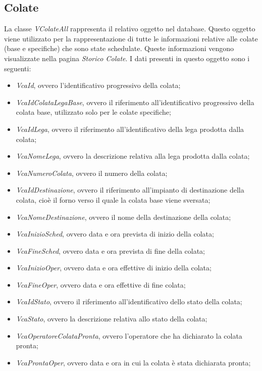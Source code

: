   \subsection{Colate}
  La classe \textit{VColateAll} rappresenta il relativo oggetto nel database. Questo oggetto viene utilizzato per la
  rappresentazione di tutte le informazioni relative alle colate (base e specifiche) che sono state schedulate. Queste
  informazioni vengono visualizzate nella pagina \textit{Storico Colate}. I dati presenti in questo oggetto sono i seguenti:
  \begin{itemize}
    \item \textit{VcaId}, ovvero l'identificativo progressivo della colata;
    \item \textit{VcaIdColataLegaBase}, ovvero il riferimento all'identificativo progressivo della colata base,
    utilizzato solo per le colate specifiche;
    \item \textit{VcaIdLega}, ovvero il riferimento all'identificativo della lega prodotta dalla colata;
    \item \textit{VcaNomeLega}, ovvero la descrizione relativa alla lega prodotta dalla colata;
    \item \textit{VcaNumeroColata}, ovvero il numero della colata;
    \item \textit{VcaIdDestinazione}, ovvero il riferimento all'impianto di destinazione della colata, cioè
    il forno verso il quale la colata base viene sversata;
    \item \textit{VcaNomeDestinazione}, ovvero il nome della destinazione della colata;
    \item \textit{VcaInizioSched}, ovvero data e ora prevista di inizio della colata;
    \item \textit{VcaFineSched}, ovvero data e ora prevista di fine della colata;
    \item \textit{VcaInizioOper}, ovvero data e ora effettive di inizio della colata;
    \item \textit{VcaFineOper}, ovvero data e ora effettive di fine colata;
    \item \textit{VcaIdStato}, ovvero il riferimento all'identificativo dello stato della colata;
    \item \textit{VcaStato}, ovvero la descrizione relativa allo stato della colata;
    \item \textit{VcaOperatoreColataPronta}, ovvero l'operatore che ha dichiarato la colata pronta;
    \item \textit{VcaProntaOper}, ovvero data e ora in cui la colata è stata dichiarata pronta;

\end{itemize}
